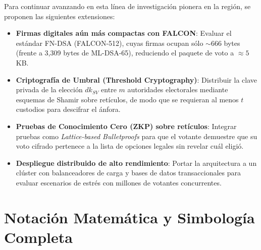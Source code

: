 \documentclass[11pt,a4paper,twoside,openright]{book}
\theoremstyle{plain}
\theoremstyle{definition}
\theoremstyle{remark}
\newcommand{\MLDSA}{\textsf{ML-DSA}}
\begin{document}
Para continuar avanzando en esta l\'inea de investigaci\'on pionera en la regi\'on, se proponen las siguientes extensiones:
\begin{itemize}
  \item \textbf{Firmas digitales a\'un m\'as compactas con FALCON}: Evaluar el est\'andar FN-DSA (FALCON-512), cuyas firmas ocupan s\'olo $\sim 666$ bytes (frente a 3,309 bytes de \MLDSA{}-65), reduciendo el paquete de voto a $\approx 5$ KB.
  \item \textbf{Criptograf\'ia de Umbral (Threshold Cryptography)}: Distribuir la clave privada de la elecci\'on $dk_{SV}$ entre $m$ autoridades electorales mediante esquemas de Shamir sobre ret\'iculos, de modo que se requieran al menos $t$ custodios para descifrar el \'anfora.
  \item \textbf{Pruebas de Conocimiento Cero (ZKP) sobre ret\'iculos}: Integrar pruebas como \emph{Lattice-based Bulletproofs} para que el votante demuestre que su voto cifrado pertenece a la lista de opciones legales sin revelar cu\'al eligi\'o.
  \item \textbf{Despliegue distribuido de alto rendimiento}: Portar la arquitectura a un cl\'uster con balanceadores de carga y bases de datos transaccionales para evaluar escenarios de estr\'es con millones de votantes concurrentes.
\end{itemize}

\appendix

\chapter{Notaci\'on Matem\'atica y Simbolog\'ia Completa}
\label{app:notacion_completa}
\end{document}
